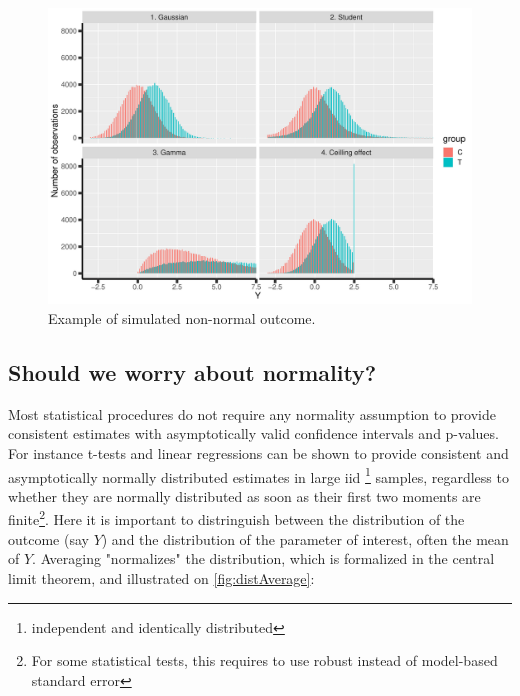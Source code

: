 \documentclass[12pt]{article}
\begin{document}
\begin{figure}[H]
\centering
\includegraphics[width=\textwidth]{./figures/examples-hist.pdf}
\caption{\label{fig:examples}Example of simulated non-normal outcome.}
\end{figure}

\subsection{Should we worry about normality?}
\label{sec:org0f792e1}

Most statistical procedures do not require any normality assumption to
provide consistent estimates with asymptotically valid confidence
intervals and p-values. For instance t-tests and linear regressions
can be shown to provide consistent and asymptotically normally
distributed estimates in large iid \footnote{independent and identically
distributed} samples, regardless to whether they are normally
distributed as soon as their first two moments are finite\footnote{For some
statistical tests, this requires to use robust instead of model-based
standard error}. Here it is important to distringuish between the
distribution of the outcome (say \(Y\)) and the distribution of the
parameter of interest, often the mean of \(Y\). Averaging "normalizes"
the distribution, which is formalized in the central limit theorem,
and illustrated on \autoref{fig:distAverage}:
\end{document}
